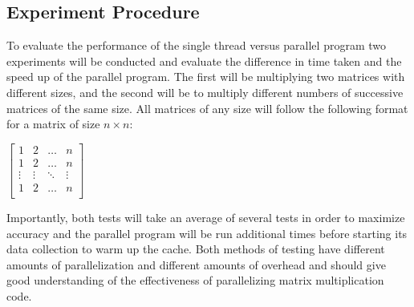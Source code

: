 \subsection{Experiment Procedure}

To evaluate the performance of the single thread versus parallel program two experiments will be conducted and evaluate the difference in time taken and the speed up of the parallel program.
The first will be multiplying two matrices with different sizes, and the second will be to multiply different numbers of successive matrices of the same size.
All matrices of any size will follow the following format for a matrix of size $n \times n$:

\vspace{5pt}
$
    \begin{bmatrix}
        1      & 2      & \dots  & n      \\
        1      & 2      & \dots  & n      \\
        \vdots & \vdots & \ddots & \vdots \\
        1      & 2      & \dots  & n      \\
    \end{bmatrix}
$
\vspace{5pt}

Importantly, both tests will take an average of several tests in order to maximize accuracy and the parallel program will be run additional times before starting its data collection to warm up the cache.
Both methods of testing have different amounts of parallelization and different amounts of overhead and should give good understanding of the effectiveness of parallelizing matrix multiplication code.